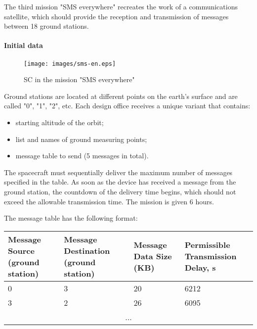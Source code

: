 \documentclass[12pt,a4paper]{article}
\begin{document}
The third mission "SMS everywhere" recreates the work of a communications satellite, which should provide the reception and transmission of messages between 18 ground stations.

\paragraph{Initial data}

\begin{figure}[tbh]
  \begin{center}
    \texttt{[image: images/sms-en.eps]}
    \caption{SC in the mission "SMS everywhere"}
    \label{Pic:SMS}
  \end{center}
\end{figure}

Ground stations are located at different points on the earth's surface and are called "0", "1", "2", etc. Each design office receives a unique variant that contains:

\begin{itemize}
\item starting altitude of the orbit;
\item list and names of ground measuring points;
\item message table to send (5 messages in total).
\end{itemize}

The spacecraft must sequentially deliver the maximum number of messages specified in the table. As soon as the device has received a message from the ground station, the countdown of the delivery time begins, which should not exceed the allowable transmission time. The mission is given 6 hours.

The message table has the following format:

\begin{center}
  \begin{tabular}{|p{3.5cm}|p{3.5cm}|p{3.5cm}|p{3.5cm}|}
    \hline
    \textbf{Message Source (ground station)} & \textbf{Message Destination (ground station)} & \textbf{Message Data Size (KB)} & \textbf{Permissible Transmission Delay, s}\\
    \hline
    0 & 3 & 20 & 6212\\
    \hline
    3 & 2 & 26 & 6095\\
    \hline
    \multicolumn{4}{|c|}{...}\\
    \hline
  \end{tabular}
\end{center}
\end{document}
